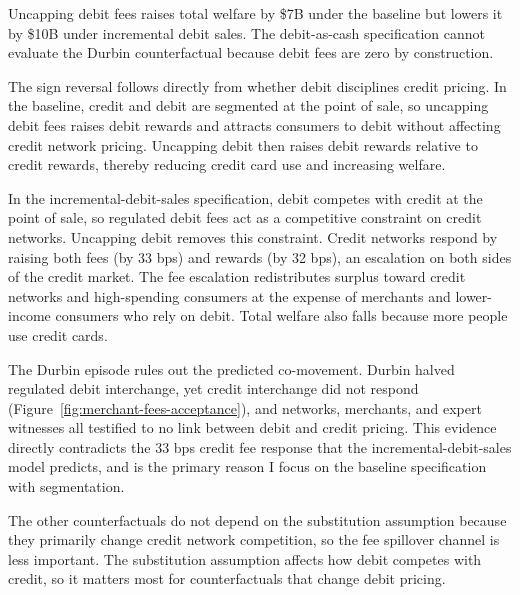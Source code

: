 \documentclass[main.tex]{subfiles}
\begin{document}
Uncapping debit fees raises total welfare by \$7B under the baseline but lowers it by \$10B under incremental debit sales.
The debit-as-cash specification cannot evaluate the Durbin counterfactual because debit fees are zero by construction.

The sign reversal follows directly from whether debit disciplines credit pricing.
In the baseline, credit and debit are segmented at the point of sale, so uncapping debit fees raises debit rewards and attracts consumers to debit without affecting credit network pricing.
Uncapping debit then raises debit rewards relative to credit rewards, thereby reducing credit card use and increasing welfare.

In the incremental-debit-sales specification, debit competes with credit at the point of sale, so regulated debit fees act as a competitive constraint on credit networks.
Uncapping debit removes this constraint.
Credit networks respond by raising both fees (by 33 bps) and rewards (by 32 bps), an escalation on both sides of the credit market.
The fee escalation redistributes surplus toward credit networks and high-spending consumers at the expense of merchants and lower-income consumers who rely on debit. Total welfare also falls because more people use credit cards.

The Durbin episode rules out the predicted co-movement.
Durbin halved regulated debit interchange, yet credit interchange did not respond (Figure~\ref{fig:merchant-fees-acceptance}), and networks, merchants, and expert witnesses all testified to no link between debit and credit pricing.
This evidence directly contradicts the 33 bps credit fee response that the incremental-debit-sales model predicts, and is the primary reason I focus on the baseline specification with segmentation.

The other counterfactuals do not depend on the substitution assumption because they primarily change credit network competition, so the fee spillover channel is less important.
The substitution assumption affects how debit competes with credit, so it matters most for counterfactuals that change debit pricing.
\end{document}
